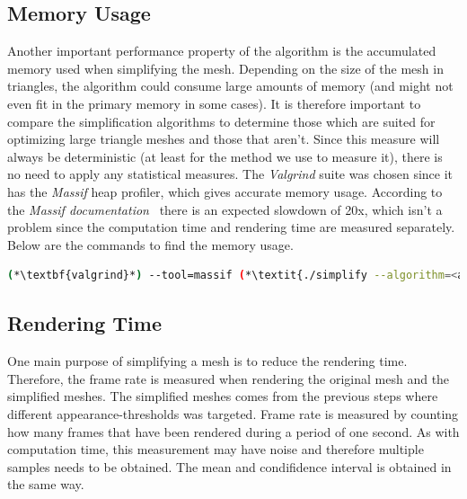         \subsection{Memory Usage} \label{sec:memory_usage}

        Another important performance property of the algorithm is the accumulated memory used when simplifying the mesh. Depending on the size of the mesh in triangles, the algorithm could consume large amounts of memory (and might not even fit in the primary memory in some cases). It is therefore important to compare the simplification algorithms to determine those which are suited for optimizing large triangle meshes and those that aren't. Since this measure will always be deterministic (at least for the method we use to measure it), there is no need to apply any statistical measures. The \emph{Valgrind} suite was chosen since it has the \emph{Massif} heap profiler, which gives accurate memory usage. According to the \emph{Massif documentation}~\cite{valgrind2017manual} there is an expected slowdown of 20x, which isn't a problem since the computation time and rendering time are measured separately. Below are the commands to find the memory usage.

        \begin{lstlisting}[language=bash]
 (*\textbf{valgrind}*) --tool=massif (*\textit{./simplify --algorithm=<algorithm> <input-mesh> <output-mesh>}*)
        \end{lstlisting}

        \subsection{Rendering Time} \label{sec:rendering_time}
        One main purpose of simplifying a mesh is to reduce the rendering time. Therefore, the frame rate is measured when rendering the original mesh and the simplified meshes. The simplified meshes comes from the previous steps where different appearance-thresholds was targeted. Frame rate is measured by counting how many frames that have been rendered during a period of one second. As with computation time, this measurement may have noise and therefore multiple samples needs to be obtained. The mean and condifidence interval is obtained in the same way.


